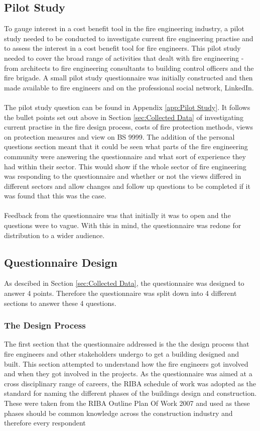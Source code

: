 \documentclass[table,a4paper,oneside]{book}
\begin{document}
\subsection{Pilot Study}
\label{sec:Pilot_Study}
To gauge interest in a cost benefit tool in the fire engineering industry, a pilot study needed to be conducted to investigate current fire engineering practise and to assess the interest in a cost benefit tool for fire engineers. This pilot study needed to cover the broad range of activities that dealt with fire engineering - from architects to fire engineering consultants to building control officers and the fire brigade. A small pilot study questionnaire was initially constructed and then made available to fire engineers and on the professional social network, LinkedIn.
\\
\\
The pilot study question can be found in Appendix \ref{app:Pilot Study}. It follows the bullet points set out above in Section \ref{sec:Collected Data} of investigating current practise in the fire design process, costs of fire protection methods, views on protection measures and view on BS 9999. The addition of the personal questions section meant that it could be seen what parts of the fire engineering community were answering the questionnaire and what sort of experience they had within their sector. This would show if the whole sector of fire engineering was responding to the questionnaire and whether or not the views differed in different sectors and allow changes and follow up questions to be completed if it was found that this was the case.
\\
\\
Feedback from the questionnaire was that initially it was to open and the questions were to vague. With this in mind, the questionnaire was redone for distribution to a wider audience.

\subsection{Questionnaire Design}
\label{sec:Questionnaire_Design}
As descibed in Section \ref{sec:Collected Data}, the questionnaire was designed to answer 4 points. Therefore the questionnaire was split down into 4 different sections to answer these 4 questions.

\subsubsection{The Design Process}
\label{sec:The_Design_Process}
The first section that the questionnaire addressed is the the design process that fire engineers and other stakeholders undergo to get a building designed and built. This section attempted to understand how the fire engineers got involved and when they got involved in the projects. As the questionnaire was aimed at a cross disciplinary range of careers, the \ac{RIBA} schedule of work was adopted as the standard for naming the different phases of the buildings design and construction. These were taken from the RIBA Outline Plan Of Work 2007 \citep{RoyalInstituteofBritishArchitects2007} and used as these phases should be common knowledge across the construction industry and therefore every respondent
\end{document}
